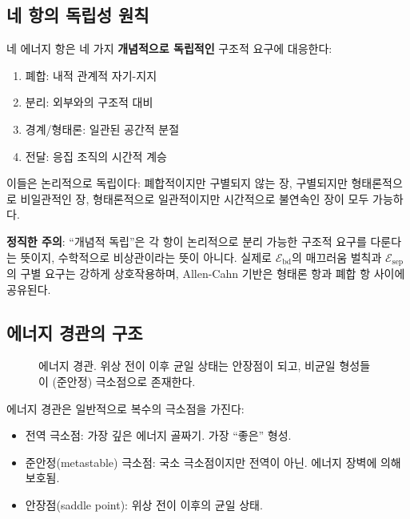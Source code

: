 \subsection{네 항의 독립성 원칙}

네 에너지 항은 네 가지 \textbf{개념적으로 독립적인} 구조적 요구에 대응한다:
\begin{enumerate}
    \item 폐합: 내적 관계적 자기-지지
    \item 분리: 외부와의 구조적 대비
    \item 경계/형태론: 일관된 공간적 분절
    \item 전달: 응집 조직의 시간적 계승
\end{enumerate}

이들은 논리적으로 독립이다: 폐합적이지만 구별되지 않는 장, 구별되지만 형태론적으로 비일관적인 장, 형태론적으로 일관적이지만 시간적으로 불연속인 장이 모두 가능하다.

\textbf{정직한 주의}: ``개념적 독립''은 각 항이 논리적으로 분리 가능한 구조적 요구를 다룬다는 뜻이지, 수학적으로 비상관이라는 뜻이 아니다. 실제로 $\mathcal{E}_{\mathrm{bd}}$의 매끄러움 벌칙과 $\mathcal{E}_{\mathrm{sep}}$의 구별 요구는 강하게 상호작용하며, Allen-Cahn 기반은 형태론 항과 폐합 항 사이에 공유된다.

\subsection{에너지 경관의 구조}

\begin{figure}[t]
\centering
\caption{에너지 경관. 위상 전이 이후 균일 상태는 안장점이 되고, 비균일 형성들이 (준안정) 극소점으로 존재한다.}
\label{fig:energy-landscape}
\end{figure}

에너지 경관은 일반적으로 복수의 극소점을 가진다:
\begin{itemize}
    \item 전역 극소점: 가장 깊은 에너지 골짜기. 가장 ``좋은'' 형성.
    \item 준안정(metastable) 극소점: 국소 극소점이지만 전역이 아닌. 에너지 장벽에 의해 보호됨.
    \item 안장점(saddle point): 위상 전이 이후의 균일 상태.
\end{itemize}

